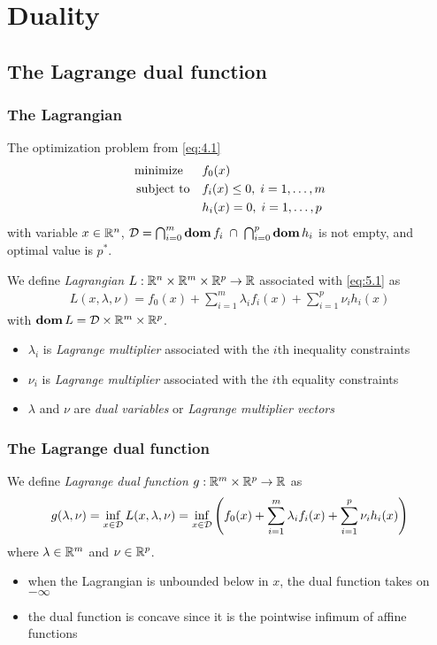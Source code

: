 \chapter{Duality}

\section{The Lagrange dual function}

\subsection{The Lagrangian}
The optimization problem from \eqref{eq:4.1}
\begin{align}
  \text{minimize\;\;}\quad& f_0(x)\nonumber\\
  \text{subject to}  \quad& f_i(x)\le 0,\;i=1,\dots,m\label{eq:5.1}\\
                          & h_i(x) =  0,\;i=1,\dots,p\nonumber
\end{align}
with variable $x\in\mathbb{R}^n$, $\mathcal{D}=\bigcap_{i=0}^m\mathop{\bf dom} f_i\;\cap\;\bigcap_{i=0}^p\mathop{\bf dom} h_i$ is not empty, and optimal value is $p^\ast$.\par
We define \textit{Lagrangian} $L:\mathbb{R}^n\times \mathbb{R}^m\times \mathbb{R}^p\rightarrow\mathbb{R}$ associated with \eqref{eq:5.1} as
\begin{align*}
  L(x,\lambda,\nu)=f_0(x)+\sum_{i=1}^m\lambda_if_i(x)+\sum_{i=1}^p\nu_ih_i(x)
\end{align*}
with $\mathop{\bf dom} L=\mathcal{D}\times \mathbb{R}^m\times\mathbb{R}^p$.
\begin{itemize}
  \item $\lambda_i$ is \textit{Lagrange multiplier} associated with the $i$th inequality constraints
  \item $\nu_i$ is \textit{Lagrange multiplier} associated with the $i$th equality constraints
  \item $\lambda$ and $\nu$ are \textit{dual variables} or \textit{Lagrange multiplier vectors}
\end{itemize}

\subsection{The Lagrange dual function}
We define \textit{Lagrange dual function} $g:\mathbb{R}^m\times\mathbb{R}^p\rightarrow\mathbb{R}$ as
\begin{align*}
  g(\lambda,\nu)=\inf_{x\in\mathcal{D}}L(x,\lambda,\nu)=\inf_{x\in\mathcal{D}}\left(f_0(x)+\sum_{i=1}^m\lambda_if_i(x)+\sum_{i=1}^p\nu_ih_i(x)\right)
\end{align*}
where $\lambda\in\mathbb{R}^m$ and $\nu\in\mathbb{R}^p$.
\begin{itemize}
  \item when the Lagrangian is unbounded below in $x$, the dual function takes on $-\infty$
  \item the dual function is concave since it is the pointwise infimum of affine functions
\end{itemize}

